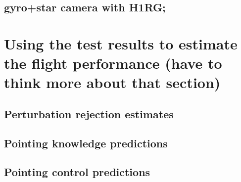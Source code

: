 \subsection{gyro+star camera with H1RG;}

\section{	Using the test results to estimate the flight performance (have to think more about that section)}
\subsection{Perturbation rejection estimates}
\subsection{Pointing knowledge predictions}
\subsection{Pointing control predictions}
